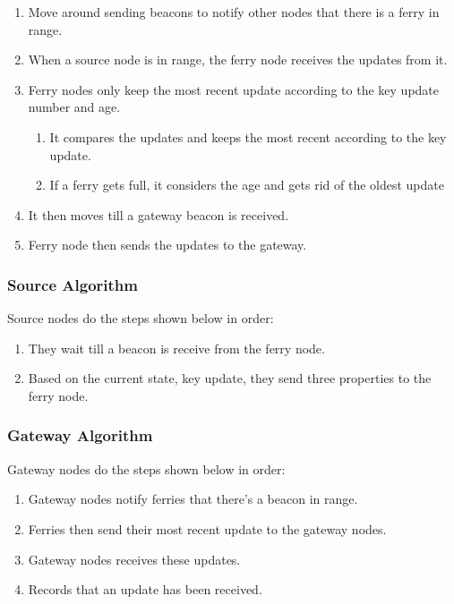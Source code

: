 \begin{enumerate}
\item Move around sending beacons to notify other nodes that there is a ferry in range.
\item When a source node is in range, the ferry node receives the updates from it.
\item Ferry nodes only keep the most recent update according to the key update number and age.
	\begin{enumerate}
	\item It compares the updates and keeps the most recent according to the key update.
	\item If a ferry gets full, it considers the age and gets rid of the oldest update
	\end{enumerate}
\item It then moves till a gateway beacon is received.
\item Ferry node then sends the updates to the gateway.
\end{enumerate}

\subsubsection{Source Algorithm}

Source nodes do the steps shown below in order:

\begin{enumerate}
\item They wait till a beacon is receive from the ferry node.
\item Based on the current state, key update,  they send three properties to the ferry node.

\end{enumerate}


\subsubsection{Gateway Algorithm}

Gateway nodes do the steps shown below in order:

\begin{enumerate}
\item Gateway nodes notify ferries that there's a beacon in range.
\item Ferries then send their most recent update to the gateway nodes.
\item Gateway nodes receives these updates.
\item Records that an update has been received.
\end{enumerate}


